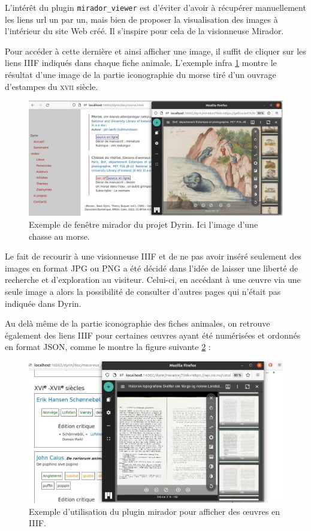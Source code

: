 \documentclass[a4paper,12pt,twoside]{book}
\begin{document}
L'intérêt du plugin \texttt{mirador\_viewer} est d'éviter d'avoir à récupérer manuellement les liens url un par un, mais bien de proposer la visualisation des images à l'intérieur du site Web créé. Il s'inspire pour cela de la visionneuse Mirador.




Pour accéder à cette dernière et ainsi afficher une image, il suffit de cliquer sur les liens \acrshort{IIIF} indiqués dans chaque fiche animale. L'exemple infra \ref{morse} montre le résultat d'une image de la partie iconographie du morse tiré d'un ouvrage d'estampes du \textsc{xvii}\ieme{} siècle.

\begin{figure}[H]
    \centering
    \includegraphics[width=13cm]{img/partie_3/morse.JPG}
    \caption{Exemple de fenêtre mirador du projet Dyrin. Ici l'image d'une chasse au morse.}
    \label{morse}
\end{figure}


Le fait de recourir à une visionneuse \acrshort{IIIF} et de ne pas avoir inséré seulement des images en format \acrshort{JPG} ou \acrshort{PNG} a été décidé dans l'idée de laisser une liberté de recherche et d'exploration au visiteur. Celui-ci, en accédant à une \oe{}uvre via une seule image a alors la possibilité de consulter d'autres pages qui n'était pas indiquée dans Dyrin.


Au delà même de la partie iconographie des fiches animales, on retrouve également des liens \acrshort{IIIF} pour certaines \oe{}uvres ayant été numérisées et ordonnés en format JSON, comme le montre la figure suivante \ref{macareux_mirador} :

\begin{figure}[H]
    \centering
    \includegraphics[width=13cm]{img/partie_3/macareux_mirador.JPG}
    \caption{Exemple d'utilisation du plugin mirador pour afficher des \oe{}uvres en \acrshort{IIIF}.}
    \label{macareux_mirador}
\end{figure}
\end{document}
